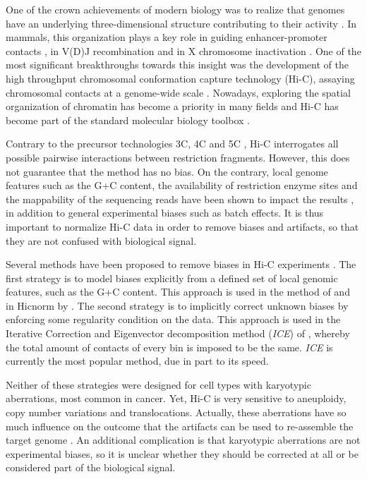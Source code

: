 \documentclass{bioinfo}
\begin{document}
One of the crown achievements of modern biology was to realize that
genomes have an underlying three-dimensional structure contributing to
their activity \citep{rowley2016three, dekker20163d, pezic2017more}. In
mammals, this organization plays a key role in guiding enhancer-promoter
contacts \citep{de2013topology}, in V(D)J recombination
\citep{choi2014ctcf} and in X chromosome inactivation \citep{galupa2015x}.
One of the most significant breakthroughs towards this insight was the
development of the high throughput chromosomal conformation capture
technology (Hi-C), assaying chromosomal contacts at a genome-wide scale
\citep{lieberman2009comprehensive}. Nowadays, exploring the spatial
organization of chromatin has become a priority in many fields and Hi-C
has become part of the standard molecular biology toolbox
\citep{dekker2013exploring}.

Contrary to the precursor technologies 3C, 4C and 5C
\citep{dekker2002capturing, simonis2006nuclear,
dostie2006chromosome,de2012decade}, Hi-C interrogates all possible
pairwise interactions between restriction fragments. However, this does
not guarantee that the method has no bias.  On the contrary, local genome
features such as the G+C content, the availability of restriction enzyme
sites and the mappability of the sequencing reads have been shown to
impact the results \citep{yaffe2011probabilistic}, in addition to general
experimental biases such as batch effects. It is thus important to
normalize Hi-C data in order to remove biases and artifacts, so that they
are not confused with biological signal.

Several methods have been proposed to remove biases in Hi-C experiments
\citep{schmitt2016genome}. The first strategy is to model biases
explicitly from a defined set of local genomic features, such as the G+C
content. This approach is used in the method of
\cite{yaffe2011probabilistic} and in Hicnorm by \cite{hu2012hicnorm}. The
second strategy is to implicitly correct unknown biases by enforcing some
regularity condition on the data. This approach is used in the
Iterative Correction and Eigenvector decomposition method (\textit{ICE})
of \cite{imakaev2012iterative}, whereby the total amount of contacts of
every bin is imposed to be the same. \textit{ICE} is currently the most
popular method, due in part to its speed.

Neither of these strategies were designed for cell types with karyotypic
aberrations, most common in cancer. Yet, Hi-C is very sensitive to
aneuploidy, copy number variations and translocations.  Actually, these
aberrations have so much influence on the outcome that the artifacts can
be used to re-assemble the target genome \citep{korbel2013genome}. An
additional complication is that karyotypic aberrations are not
experimental biases, so it is unclear whether they should be corrected at
all or be considered part of the biological signal.
\end{document}
